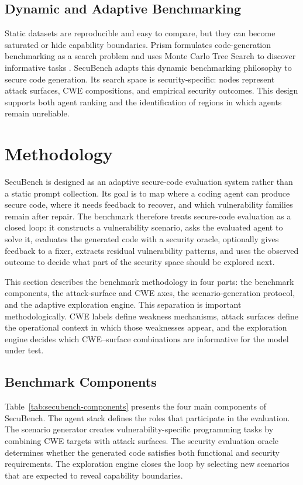 \documentclass[11pt]{article}
\newcommand{\toolname}{SecuBench}
\begin{document}
\subsection{Dynamic and Adaptive Benchmarking}

Static datasets are reproducible and easy to compare, but they can become saturated or hide capability boundaries. Prism formulates code-generation benchmarking as a search problem and uses Monte Carlo Tree Search to discover informative tasks \cite{majdinasab2025prism}. \toolname{} adapts this dynamic benchmarking philosophy to secure code generation. Its search space is security-specific: nodes represent attack surfaces, CWE compositions, and empirical security outcomes. This design supports both agent ranking and the identification of regions in which agents remain unreliable.

\section{Methodology}

\toolname{} is designed as an adaptive secure-code evaluation system rather than a static prompt collection. Its goal is to map where a coding agent can produce secure code, where it needs feedback to recover, and which vulnerability families remain after repair. The benchmark therefore treats secure-code evaluation as a closed loop: it constructs a vulnerability scenario, asks the evaluated agent to solve it, evaluates the generated code with a security oracle, optionally gives feedback to a fixer, extracts residual vulnerability patterns, and uses the observed outcome to decide what part of the security space should be explored next.

This section describes the benchmark methodology in four parts: the benchmark components, the attack-surface and CWE axes, the scenario-generation protocol, and the adaptive exploration engine. This separation is important methodologically. CWE labels define weakness mechanisms, attack surfaces define the operational context in which those weaknesses appear, and the exploration engine decides which CWE--surface combinations are informative for the model under test.

\subsection{Benchmark Components}

Table~\ref{tab:secubench-components} presents the four main components of \toolname{}. The agent stack defines the roles that participate in the evaluation. The scenario generator creates vulnerability-specific programming tasks by combining CWE targets with attack surfaces. The security evaluation oracle determines whether the generated code satisfies both functional and security requirements. The exploration engine closes the loop by selecting new scenarios that are expected to reveal capability boundaries.
\end{document}

